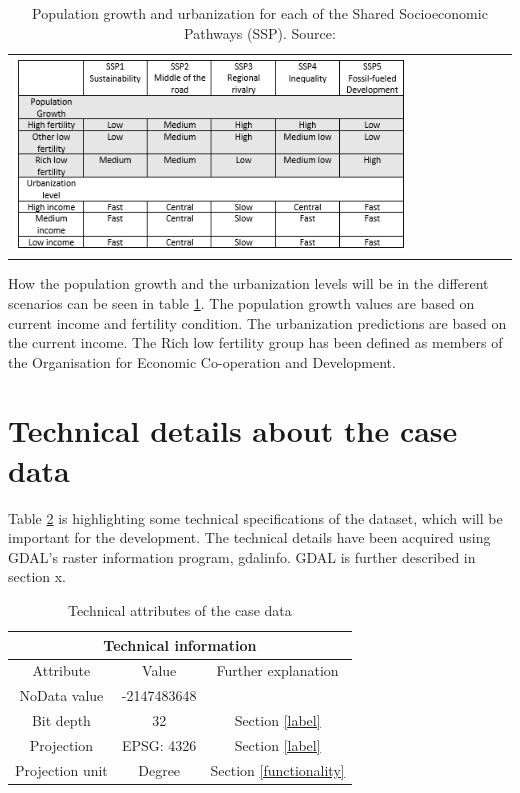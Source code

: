 \begin{table}[htbp]
	\centering
	\begin{tabular}{l}
		\includegraphics[width=0.8\textwidth]{Pictures/SSPTable}
	\end{tabular}
	\caption{Population growth and urbanization for each of the Shared Socioeconomic Pathways (SSP). Source: \citet{WhyDetailedPop}}
	\label{SSPTable}
\end{table}

How the population growth and the urbanization levels will be in the different scenarios can be seen in table \ref{SSPTable}. The population growth values are based on current income and fertility condition. The urbanization predictions are based on the current income. The Rich low fertility group has been defined as members of the Organisation for Economic Co-operation and Development.

\section{Technical details about the case data}

Table \ref{tabTech} is highlighting some technical specifications of the dataset, which will be important for the development. The technical details have been acquired using GDAL's raster information program, gdalinfo. GDAL is further described in section x.

\begin{table}[h]%
	\centering
\begin{tabular}{|c|c|c|}
	\hline 
	\multicolumn{3}{|c|}{Technical information} \\ 
	\hline 
	Attribute & Value & Further explanation \\ 
	\hline 
	NoData value & -2147483648 &  \\ 
	\hline 
	Bit depth & 32 &  Section \ref{label}\\ 
	\hline 
	Projection & EPSG: 4326 &  Section \ref{label}\\ 
	\hline 
	Projection unit & Degree & Section \ref{functionality}  \\ 
	\hline 
\end{tabular}
\caption{Technical attributes of the case data}
 \label{tabTech}
\end{table}

